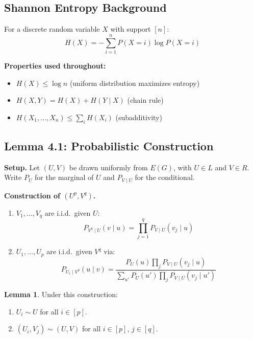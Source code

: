 \documentclass[12pt,a4paper]{article}
\theoremstyle{definition}
\newtheorem{lemma}[theorem]{Lemma}
\begin{document}
\subsection{Shannon Entropy Background}

For a discrete random variable $X$ with support $[n]$:
\[
  H(X) = -\sum_{i=1}^n P(X=i)\log P(X=i)
\]

\textbf{Properties used throughout:}
\begin{itemize}
  \item $H(X) \leq \log n$ \quad (uniform distribution maximizes entropy)
  \item $H(X,Y) = H(X) + H(Y \mid X)$ \quad (chain rule)
  \item $H(X_1,\ldots,X_n) \leq \sum_i H(X_i)$ \quad (subadditivity)
\end{itemize}

\subsection{Lemma 4.1: Probabilistic Construction}

\textbf{Setup.} Let $(U,V)$ be drawn uniformly from $E(G)$, with $U \in L$ and $V \in R$. Write $P_U$
for the marginal of $U$ and $P_{V \mid U}$ for the conditional.

\textbf{Construction of $(U^p, V^q)$.}
\begin{enumerate}
  \item[(a)] $V_1, \ldots, V_q$ are i.i.d.\ given $U$:
    \[P_{V^q \mid U}(v \mid u) = \prod_{j=1}^q P_{V \mid U}(v_j \mid u)\]

  \item[(b)] $U_1, \ldots, U_p$ are i.i.d.\ given $V^q$ via:
    \[P_{U_i \mid V^q}(u \mid v)
      = \frac{P_U(u)\prod_j P_{V \mid U}(v_j \mid u)}
             {\sum_{u'} P_U(u')\prod_j P_{V \mid U}(v_j \mid u')}\]
\end{enumerate}

\begin{lemma}
  Under this construction:
  \begin{enumerate}
    \item[(i)] $U_i \sim U$ for all $i \in [p]$.
    \item[(ii)] $(U_i, V_j) \sim (U,V)$ for all $i \in [p]$, $j \in [q]$.
  \end{enumerate}
\end{lemma}
\end{document}

